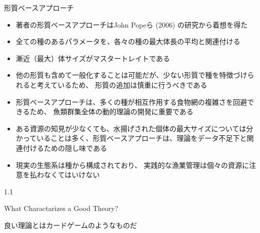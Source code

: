\documentclass[
  ignorenonframetext,
]{beamer}
\providecommand{\tightlist}{%
  \setlength{\itemsep}{0pt}\setlength{\parskip}{0pt}}
\newcommand{\vspacesmall}{\vspace{3mm}}
\begin{document}
\begin{frame}{形質ベースアプローチ}
\protect\hypertarget{ux5f62ux8ceaux30d9ux30fcux30b9ux30a2ux30d7ux30edux30fcux30c1}{}

\begin{itemize}
\tightlist
\item
  著者の形質ベースアプローチはJohn Popeら (2006) の研究から着想を得た\\
  \vspacesmall
\item
  全ての種のあるパラメータを、各々の種の最大体長の平均と関連付ける
  \vspacesmall
\item
  漸近（最大）体サイズがマスタートレイトである \vspacesmall
\item
  他の形質も含めて一般化することは可能だが、少ない形質で種を特徴づけられると考えているため、
  形質の追加は慎重に行うべきである\\
  \vspacesmall
\item
  形質ベースアプローチは、多くの種が相互作用する食物網の複雑さを回避できるため、
  魚類群集全体の動的理論の開発に重要である\\
  \vspacesmall
\item
  ある資源の知見が少なくても、水揚げされた個体の最大サイズについては分かっていることは多く、形質ベースアプローチは、理論をデータ不足下と関連付けるための隠し味である\\
  \vspacesmall
\item
  現実の生態系は種から構成されており、
  実践的な漁業管理は個々の資源に注意を払わなくてはいけない
\end{itemize}

\end{frame}

\begin{frame}

\begin{LARGE} 
\begin{center}
\begin{bf}
1.1   
  
What Charactarizes a Good Theory?
\end{bf}
\end{center}
\end{LARGE}

\end{frame}

\begin{frame}{良い理論とはカードゲームのようなものだ}
\protect\hypertarget{ux826fux3044ux7406ux8ad6ux3068ux306fux30abux30fcux30c9ux30b2ux30fcux30e0ux306eux3088ux3046ux306aux3082ux306eux3060}{}

\end{frame}
\end{document}
